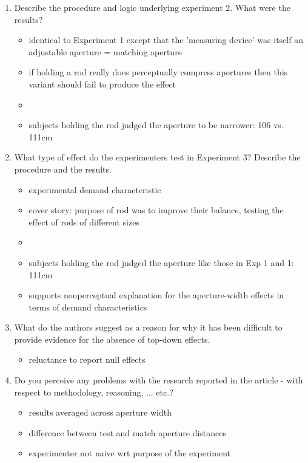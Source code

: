 \documentclass[12pt,english]{scrartcl}
\begin{document}
\begin{enumerate}
 \item Describe the procedure and logic underlying experiment 2. What were the results?
 
 \color{blue}
 \begin{itemize}
 \item identical to Experiment 1 except that the 'measuring device' was itself an adjustable aperture = matching aperture 
 \item if holding a rod really does perceptually compress apertures then this variant should fail to produce the effect

 \item[]
 \item subjects holding the rod judged the aperture to be narrower: 106 vs. 111cm
\end{itemize}
  \color{black}


 \item What type of effect do the experimenters test in Experiment 3? Describe the procedure and the results.

 \color{blue}
 \begin{itemize}
 \item experimental demand characteristic 
 \item cover story: purpose of rod was to improve their balance, testing the effect of rods of different sizes
 \item[]
 \item subjects holding the rod judged the aperture like those in Exp 1 and 1: 111cm
 \item supports nonperceptual explanation for the aperture-width effects in terms of demand characteristics
\end{itemize}
  \color{black}

\item What do the authors suggest as a reason for why it has been difficult to provide evidence for the absence of top-down effects. 
 \color{blue}
 \begin{itemize}
 \item reluctance to report null effects 
\end{itemize}
  \color{black}
 

\item Do you perceive any problems with the research reported in the article - with respect to methodology, reasoning, ... etc.? 
 \color{blue}
 \begin{itemize}
 \item results averaged across aperture width
 \item difference between test and match aperture distances
 \item experimenter not naive wrt purpose of the experiment 
\end{itemize}
  \color{black}

\end{enumerate}
\end{document}

